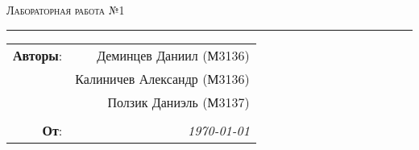 
\begin{center}
    \LARGE \textsc{Лабораторная работа №1}
\end{center}

\hrule

\phantom{42}

\begin{flushright}
    \begin{tabular}{rr}
        \textbf{Авторы}: 
        & Деминцев Даниил (М3136) \\
        & Калиничев Александр (М3136) \\
        & Ползик Даниэль (М3137) \\
        & \\
        \textbf{От}: &
        \textit{\today}\\
    \end{tabular}
\end{flushright}


